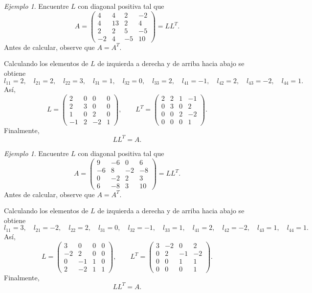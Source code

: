 \documentclass[12pt]{article}
\theoremstyle{remark}
\newtheorem{Ejem}[definicion]{Ejemplo}
\begin{document}
\begin{Ejem}

Encuentre $L$ con diagonal positiva tal que
\[
A=\begin{pmatrix}4 & 4 & 2 & -2\\4 & 13 & 2 & 4\\2 & 2 & 5 & -5\\-2 & 4 & -5 & 10\end{pmatrix}=LL^T.
\]
Antes de calcular, observe que $A=A^T$.

Calculando los elementos de $L$ de izquierda a derecha y de arriba hacia abajo se obtiene
\[
l_{11}=2,\quad l_{21}=2,\quad l_{22}=3,\quad l_{31}=1,\quad l_{32}=0,\quad l_{33}=2,\quad l_{41}=-1,\quad l_{42}=2,\quad l_{43}=-2,\quad l_{44}=1.
\]
Así,
\[
L=\begin{pmatrix}2 & 0 & 0 & 0\\2 & 3 & 0 & 0\\1 & 0 & 2 & 0\\-1 & 2 & -2 & 1\end{pmatrix},\qquad L^T=\begin{pmatrix}2 & 2 & 1 & -1\\0 & 3 & 0 & 2\\0 & 0 & 2 & -2\\0 & 0 & 0 & 1\end{pmatrix}.
\]
Finalmente,
\[
\boxed{LL^T=A}.
\]

\end{Ejem}

\begin{Ejem}
Encuentre $L$ con diagonal positiva tal que
\[
A=\begin{pmatrix}9 & -6 & 0 & 6\\-6 & 8 & -2 & -8\\0 & -2 & 2 & 3\\6 & -8 & 3 & 10\end{pmatrix}=LL^T.
\]
Antes de calcular, observe que $A=A^T$.

Calculando los elementos de $L$ de izquierda a derecha y de arriba hacia abajo se obtiene
\[
l_{11}=3,\quad l_{21}=-2,\quad l_{22}=2,\quad l_{31}=0,\quad l_{32}=-1,\quad l_{33}=1,\quad l_{41}=2,\quad l_{42}=-2,\quad l_{43}=1,\quad l_{44}=1.
\]
Así,
\[
L=\begin{pmatrix}3 & 0 & 0 & 0\\-2 & 2 & 0 & 0\\0 & -1 & 1 & 0\\2 & -2 & 1 & 1\end{pmatrix},\qquad L^T=\begin{pmatrix}3 & -2 & 0 & 2\\0 & 2 & -1 & -2\\0 & 0 & 1 & 1\\0 & 0 & 0 & 1\end{pmatrix}.
\]
Finalmente,
\[
\boxed{LL^T=A}.
\]

\end{Ejem}
\end{document}
